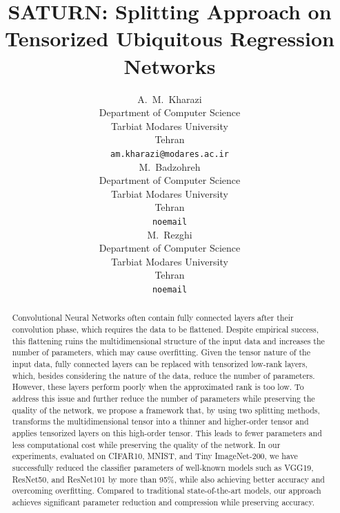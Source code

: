 \documentclass{article}
\title{SATURN: Splitting Approach on Tensorized Ubiquitous Regression Networks}
\author{%
	A.~M.~Kharazi\\
	Department of Computer Science\\
	Tarbiat Modares University\\
	Tehran \\
	\texttt{am.kharazi@modares.ac.ir} \\
	\And
	M.~Badzohreh\\
	Department of Computer Science\\
	Tarbiat Modares University\\
	Tehran \\
	\texttt{noemail} \\ %
	\And
	M.~Rezghi\\
	Department of Computer Science\\
	Tarbiat Modares University\\
	Tehran \\
	\texttt{noemail} \\ %
}
\begin{document}
\maketitle


\begin{abstract}
Convolutional Neural Networks often contain fully connected layers after their convolution phase, which requires the data to be flattened. Despite empirical success, this flattening ruins the multidimensional structure of the input data and increases the number of parameters, which may cause overfitting. Given the tensor nature of the input data, fully connected layers can be replaced with tensorized low-rank layers, which, besides considering the nature of the data, reduce the number of parameters. However, these layers perform poorly when the approximated rank is too low. To address this issue and further reduce the number of parameters while preserving the quality of the network, we propose a framework that, by using two splitting methods, transforms the multidimensional tensor into a thinner and higher-order tensor and applies tensorized layers on this high-order tensor. This leads to fewer parameters and less computational cost while preserving the quality of the network. In our experiments, evaluated on CIFAR10, MNIST, and Tiny ImageNet-200, we have successfully reduced the classifier parameters of well-known models such as VGG19, ResNet50, and ResNet101 by more than 95\%, while also achieving better accuracy and overcoming overfitting. Compared to traditional state-of-the-art models, our approach achieves significant parameter reduction and compression while preserving accuracy.
   
\end{abstract}


\end{document}
